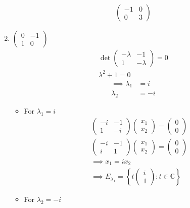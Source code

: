 \begin{enumerate}
\begin{gather}
\begin{pmatrix}
-1 & 0\\
0 & 3
\end{pmatrix}
\end{gather}
\item $\begin{pmatrix} 0 & -1\\1 & 0\end{pmatrix}$
\begin{gather}
\det{
\begin{pmatrix}
-\lambda & -1\\
1 & -\lambda
\end{pmatrix}
} = 0\\
\lambda^2 +1 =0  
\end{gather}
\begin{align}
\implies \lambda_1 &= i\\
\lambda_2 &= -i
\end{align}
\begin{itemize}
\item For $\lambda_1 = i$
\begin{gather}
\begin{pmatrix}
-i & -1 \\
1 & -i
\end{pmatrix}
\begin{pmatrix}
x_1\\x_2
\end{pmatrix}
=
\begin{pmatrix}
0\\0
\end{pmatrix}\\
\begin{pmatrix}
-i & -1\\
i & 1
\end{pmatrix}
\begin{pmatrix}
x_1\\x_2
\end{pmatrix}
=
\begin{pmatrix}
0\\0
\end{pmatrix}\\
\implies x_1 = ix_2\\
\implies E_{\lambda_1} = \left\{
t\begin{pmatrix}i\\1\end{pmatrix}\colon t \in \mathbb{C}
\right\}
\end{gather}
\item For $\lambda_2 = -i$
\begin{gather}

\end{gather}
\end{itemize}
\end{enumerate}
